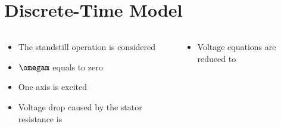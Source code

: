 \documentclass[11pt,aspectratio=169]{beamer}
\begin{document}
\section{ Discrete-Time Model}
\begin{frame}
\begin{columns}
	\begin{column}{.43\textwidth}
\begin{itemize}


	\item The standstill operation is considered
	\item $\omegam$ equals to zero
	\item One axis is excited 
	\item Voltage drop caused by the stator resistance is
	\begin{align*}
	\end{align*} 

\end{itemize}
\end{column}
\begin{column}{.53\textwidth}
	\begin{figure}
		\begin{center}
			
		\end{center}
	\end{figure}
\begin{itemize}
\item Voltage equations are reduced to 
	\begin{align*}
	\end{align*}
\end{itemize}
\end{column}
\end{columns}
\end{frame}
\end{document}
